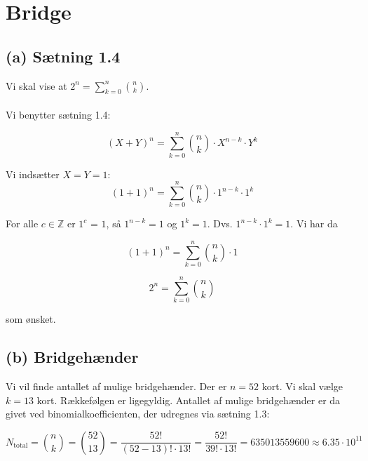 \section{Bridge}

\subsection*{(a) Sætning 1.4}

Vi skal vise at $2^n = \sum_{k=0}^{n} {n \choose k}$.\\
\\
Vi benytter sætning 1.4:

\begin{mdframed}[backgroundcolor=gray!5]
\begin{equation}
    (X+Y)^n = \sum_{k=0}^{n} {n \choose k} \cdot X^{n-k} \cdot Y^{k}
\end{equation}
\end{mdframed}
\vspace{0.5 cm}

Vi indsætter $X=Y=1$:
\begin{equation}
    (1+1)^n = \sum_{k=0}^{n} {n \choose k} \cdot 1^{n-k} \cdot 1^{k}
\end{equation}

For alle $c \in \mathbb{Z}$ er $1^c$ = $1$, så $1^{n-k}=1$ og $1^{k}=1$. Dvs.
$1^{n-k} \cdot 1^{k} = 1$. Vi har da

\begin{equation}
    (1+1)^n = \sum_{k=0}^{n} {n \choose k} \cdot 1
\end{equation}

\begin{equation}
 2^n = \sum_{k=0}^{n} {n \choose k}
\end{equation}

som ønsket.

\subsection*{(b) Bridgehænder}
Vi vil finde antallet af mulige bridgehænder. Der er $n=52$ kort. Vi skal vælge $k=13$ kort. Rækkefølgen er ligegyldig. Antallet af mulige bridgehænder er da givet ved binomialkoefficienten, der udregnes via sætning 1.3:

\begin{equation}
    N_{\text{total}} = {n \choose k} = {52 \choose 13} = \frac{52!}{(52-13)! \cdot 13!} = \frac{52!}{39! \cdot 13!} = 635013559600 \approx 6.35 \cdot 10^{11}
\end{equation}

